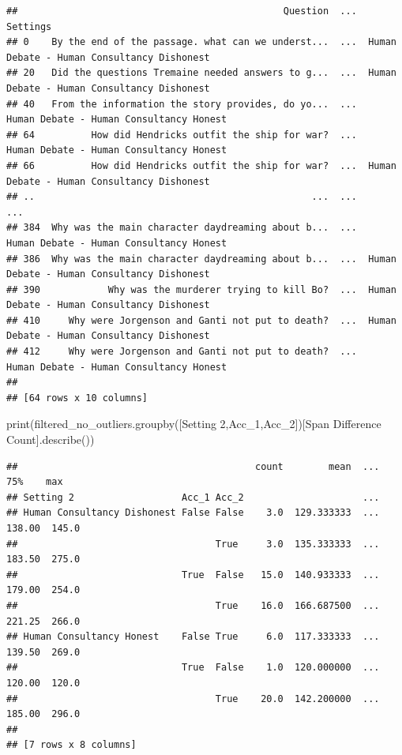 \documentclass[
]{article}
\newenvironment{Shaded}{\begin{snugshade}}{\end{snugshade}}
\newcommand{\BuiltInTok}[1]{#1}
\newcommand{\NormalTok}[1]{#1}
\newcommand{\StringTok}[1]{\textcolor[rgb]{0.31,0.60,0.02}{#1}}
\begin{document}
\begin{verbatim}
##                                               Question  ...                                    Settings
## 0    By the end of the passage. what can we underst...  ...  Human Debate - Human Consultancy Dishonest
## 20   Did the questions Tremaine needed answers to g...  ...  Human Debate - Human Consultancy Dishonest
## 40   From the information the story provides, do yo...  ...     Human Debate - Human Consultancy Honest
## 64          How did Hendricks outfit the ship for war?  ...     Human Debate - Human Consultancy Honest
## 66          How did Hendricks outfit the ship for war?  ...  Human Debate - Human Consultancy Dishonest
## ..                                                 ...  ...                                         ...
## 384  Why was the main character daydreaming about b...  ...     Human Debate - Human Consultancy Honest
## 386  Why was the main character daydreaming about b...  ...  Human Debate - Human Consultancy Dishonest
## 390            Why was the murderer trying to kill Bo?  ...  Human Debate - Human Consultancy Dishonest
## 410     Why were Jorgenson and Ganti not put to death?  ...  Human Debate - Human Consultancy Dishonest
## 412     Why were Jorgenson and Ganti not put to death?  ...     Human Debate - Human Consultancy Honest
## 
## [64 rows x 10 columns]
\end{verbatim}

\begin{Shaded}
\begin{Highlighting}[]
\BuiltInTok{print}\NormalTok{(filtered\_no\_outliers.groupby([}\StringTok{\textquotesingle{}Setting 2\textquotesingle{}}\NormalTok{,}\StringTok{\textquotesingle{}Acc\_1\textquotesingle{}}\NormalTok{,}\StringTok{\textquotesingle{}Acc\_2\textquotesingle{}}\NormalTok{])[}\StringTok{\textquotesingle{}Span Difference Count\textquotesingle{}}\NormalTok{].describe())}
\end{Highlighting}
\end{Shaded}

\begin{verbatim}
##                                          count        mean  ...     75%    max
## Setting 2                   Acc_1 Acc_2                     ...               
## Human Consultancy Dishonest False False    3.0  129.333333  ...  138.00  145.0
##                                   True     3.0  135.333333  ...  183.50  275.0
##                             True  False   15.0  140.933333  ...  179.00  254.0
##                                   True    16.0  166.687500  ...  221.25  266.0
## Human Consultancy Honest    False True     6.0  117.333333  ...  139.50  269.0
##                             True  False    1.0  120.000000  ...  120.00  120.0
##                                   True    20.0  142.200000  ...  185.00  296.0
## 
## [7 rows x 8 columns]
\end{verbatim}
\end{document}
